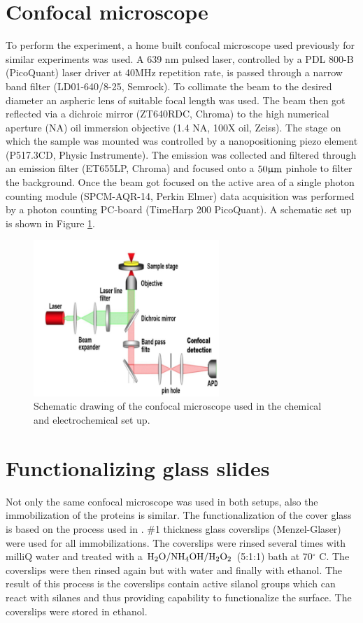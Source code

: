 \documentclass[twoside,single]{lion-msc}
\begin{document}
\section*{Confocal microscope}  \label{confo_micro}
To perform the experiment, a home built confocal microscope used previously for similar experiments \cite{Gupta2014} was used. A 639 nm pulsed laser, controlled by a PDL 800-B (PicoQuant) laser driver at 40MHz repetition rate, is passed through a narrow band filter (LD01-640/8-25, Semrock). To collimate the beam to the desired diameter an aspheric lens of suitable focal length was used. The beam then got reflected via a dichroic mirror (ZT640RDC, Chroma) to the high numerical aperture (NA) oil immersion objective (1.4 NA, 100X oil, Zeiss). The stage on which the sample was mounted was controlled by a nanopositioning piezo element (P517.3CD, Physic Instrumente). The emission was collected and filtered through an emission filter (ET655LP, Chroma) and focused onto a $50\upmu \textup{m}$ pinhole to filter the background. Once the beam got focused on the active area of a single photon counting module (SPCM-AQR-14, Perkin Elmer) data acquisition was performed by a photon counting PC-board (TimeHarp 200 PicoQuant). A schematic set up is shown in Figure \ref{micros}.

\begin{figure}[ht!]
\centering
\includegraphics[width=70mm]{schem_micros}
\caption{Schematic drawing of the confocal microscope used in the chemical and electrochemical set up.}
\label{micros}
\end{figure}


\section*{Functionalizing glass slides}
Not only the same confocal microscope was used in both setups, also the immobilization of the proteins is similar. The functionalization of the cover glass is based on the process used in \cite{Gupta2014}.  \diameter 25mm \#1 thickness glass coverslips (Menzel-Glaser) were used for all immobilizations. The coverslips were rinsed several times with milliQ water and treated with a  $\textup{H}_{2}\textup{O} / \textup{NH}_{4}\textup{OH} / \textup{H}_{2}\textup{O}_{2}$ (5:1:1) bath at 70$^{\circ}$ C. The coverslips were then rinsed again but with water and finally with ethanol. The result of this process is the coverslips contain active silanol groups which can react with silanes and thus providing capability to functionalize the surface. The coverslips were stored in ethanol.
\end{document}
